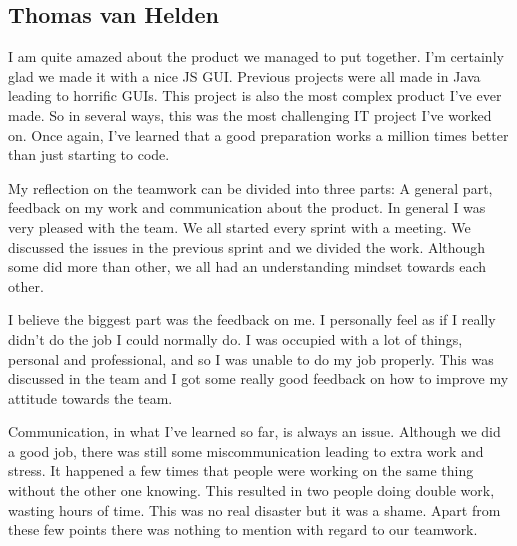 \documentclass[a4paper]{article}
\begin{document}
\subsection{Thomas van Helden}
I am quite amazed about the product we managed to put together. I'm certainly glad we made it with a nice JS GUI. Previous projects were all made in Java leading to horrific GUIs. This project is also the most complex product I've ever made. So in several ways, this was the most challenging IT project I've worked on. Once again, I've learned that a good preparation works a million times better than just starting to code. 

My reflection on the teamwork can be divided into three parts: A general part, feedback on my work and communication about the product.
In general I was very pleased with the team. We all started every sprint with a meeting. We discussed the issues in the previous sprint and we divided the work. Although some did more than other, we all had an understanding mindset towards each other.

I believe the biggest part was the feedback on me. I personally feel as if I really didn't do the job I could normally do. I was occupied with a lot of things, personal and professional, and so I was unable to do my job properly. This was discussed in the team and I got some really good feedback on how to improve my attitude towards the team. 

Communication, in what I've learned so far, is always an issue. Although we did a good job, there was still some miscommunication leading to extra work and stress. It happened a few times that people were working on the same thing without the other one knowing. This resulted in two people doing double work, wasting hours of time. This was no real disaster but it was a shame. Apart from these few points there was nothing to mention with regard to our teamwork.
\end{document}
